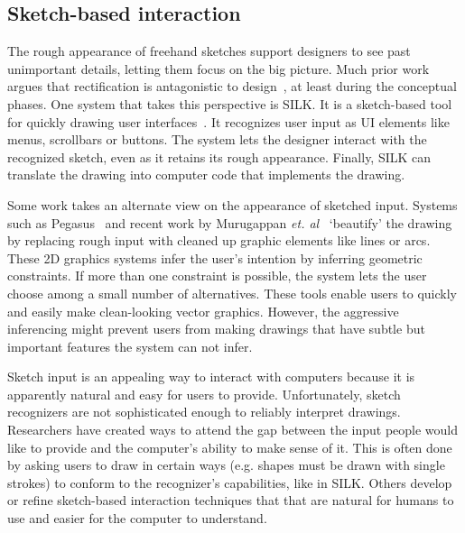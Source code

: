 \documentclass{article}
\begin{document}
\subsection{Sketch-based interaction}

The rough appearance of freehand sketches support designers to see
past unimportant details, letting them focus on the big picture. Much
prior work argues that rectification is antagonistic to
design~\cite{gross-cocktail}, at least during the conceptual
phases. One system that takes this perspective is SILK. It is a
sketch-based tool for quickly drawing user
interfaces~\cite{landay-silk-chi}. It recognizes user input as UI
elements like menus, scrollbars or buttons. The system lets the
designer interact with the recognized sketch, even as it retains its
rough appearance. Finally, SILK can translate the drawing into
computer code that implements the drawing. 


Some work takes an alternate view on the appearance of sketched
input. Systems such as Pegasus~\cite{igarashi-pegasus} and recent work
by Murugappan \textit{et. al}~\cite{murugappan-beautification}
`beautify' the drawing by replacing rough input with cleaned up
graphic elements like lines or arcs. These 2D graphics systems infer
the user's intention by inferring geometric constraints. If more than
one constraint is possible, the system lets the user choose among a
small number of alternatives. These tools enable users to quickly and
easily make clean-looking vector graphics. However, the aggressive
inferencing might prevent users from making drawings that have subtle
but important features the system can not infer.


Sketch input is an appealing way to interact with computers because it
is apparently natural and easy for users to provide. Unfortunately,
sketch recognizers are not sophisticated enough to reliably interpret
drawings. Researchers have created ways to attend the gap between the
input people would like to provide and the computer's ability to make
sense of it. This is often done by asking users to draw in certain
ways (e.g. shapes must be drawn with single strokes) to conform to the
recognizer's capabilities, like in SILK. Others develop or refine
sketch-based interaction techniques that that are natural for humans
to use and easier for the computer to understand.
\end{document}

